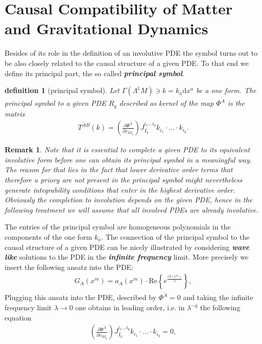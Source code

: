 \documentclass[a4paper,12pt, DIV=14, BCOR=5mm, twoside, headsepline, numbers=noenddot]{scrbook}
\newtheorem{definition}{definition}[section]
\newtheorem*{remark}{Remark}
\begin{document}
\section{Causal Compatibility of Matter and Gravitational Dynamics}
Besides of its role in the definition of an involutive PDE the symbol turns out to be also closely related to the causal structure of a given PDE. To that end we define its principal part, the so called \textbf{\textit{principal symbol}}.
\begin{definition}[principal symbol] \label{PSym}
Let $\Gamma(\Lambda^1M) \ni k = k_{a} \mathrm{d}x^a$ be a one form. The principal symbol to a given PDE $R_q$ described as kernel of the map $\Phi^{\tilde{A}}$ is the matrix
\begin{align}
    T^{\tilde{A} B}(k) = \left ( \frac{\partial \Phi^{\tilde{A}}}{\partial v_{BI_q}} \right ) J_{I_q}^{i_1...i_q} k_{i_1} \cdot ... \cdot k_{i_q}.
\end{align}
\end{definition}
\begin{remark}
Note that it is essential to complete a given PDE to its equivalent involutive form before one can obtain its principal symbol in  a meaningful way. The reason for that lies in the fact that lower derivative order terms that therefore a priory are not present in the principal symbol might nevertheless generate integrability conditions that enter in the highest derivative order. Obviously the completion to involution depends on the given PDE, hence in the following treatment we will assume that all involved PDEs are already involutive.
\end{remark}
The entries of the principal symbol are homogeneous polynomials in the components of the one form $k_a$.
The connection of the principal symbol to the causal structure of a given PDE can be nicely illustrated by considering \textit{\textbf{wave like}} solutions to the PDE in the \textit{\textbf{infinite frequency}} limit. 
More precisely we insert the following ansatz into the PDE:
\begin{align}\label{waveAns}
    G_A(x^m) = a_A(x^m) \cdot \mathrm{Re}\left \{ e^{\frac{iS(x^m)}{\lambda}} \right \},
\end{align}
Plugging this ansatz into the PDE, described by $\Phi^{\tilde{A}}=0$ and taking the infinite frequency limit $\lambda \rightarrow 0$ one obtains in leading order, i.e. in $\lambda^{-q}$ the following equation
\begin{align}
    \left ( \frac{\partial \Phi^{\tilde{A}}}{\partial v_{BI_q}} \right ) J_{I_q}^{i_1...i_q} k_{i_1} \cdot ... \cdot k_{i_q} = 0,
\end{align}
\end{document}
